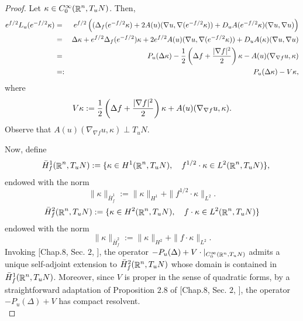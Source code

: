 \documentclass[a4paper,11pt,reqno]{amsart}
\def\R{\mathop{\rm \mathbb{R}}\nolimits}
\begin{document}
\begin{proof}
Let $\kappa\in C_0^{\infty}(\R^n,T_uN)$. Then, 
\begin{eqnarray*}
e^{f/2}L_u(e^{-f/2}\kappa)&=&e^{f/2}\left((\Delta_f(e^{-f/2}\kappa)+2A(u)(\nabla u,\nabla(e^{-f/2}\kappa))+D_uA(e^{-f/2}\kappa)(\nabla u,\nabla u)\right)\\
&=&\Delta\kappa+e^{f/2}\Delta_f(e^{-f/2})\kappa+2e^{f/2}A(u)(\nabla u,\nabla(e^{-f/2}\kappa))+D_uA(\kappa)(\nabla u,\nabla u)\\
&=&P_u(\Delta\kappa)-\frac{1}{2}\left(\Delta f+\frac{\arrowvert\nabla f\arrowvert^2}{2}\right)\kappa-A(u)(\nabla_{\nabla f} u,\kappa)\\
&=:&P_u(\Delta\kappa)-V\kappa,
\end{eqnarray*}
where $$V\kappa:=\frac{1}{2}\left(\Delta f+\frac{\arrowvert\nabla f\arrowvert^2}{2}\right)\kappa+A(u)(\nabla_{\nabla f} u,\kappa).$$
Observe that $A(u)(\nabla_{\nabla f} u,\kappa)\perp T_uN$.

Now, define 
\begin{eqnarray*}
&&\bar{H}_{f}^1(\R^n,T_uN):=\{\kappa\in H^1(\R^n,T_uN),\quad f^{1/2}\cdot \kappa\in L^2(\R^n,T_uN)\},
\end{eqnarray*}
endowed with the norm $$\|\kappa\|_{\bar{H}_{f}^1}:=\|\kappa\|_{H^1}+\|f^{1/2}\cdot\kappa\|_{L^2}.$$
\begin{eqnarray*}
\bar{H}_f^2(\R^n,T_uN):=\{\kappa\in H^2(\R^n,T_uN),\quad
f\cdot\kappa\in L^2(\R^n,T_uN) \}
\end{eqnarray*}
endowed with the norm $$\|\kappa\|_{\bar{H}_f^2}:=\|\kappa\|_{H^2}+\|f\cdot\kappa\|_{L^2}.$$
Invoking [Chap.$8$, Sec. $2$, \cite{Tay-Boo-II}], the operator $-P_u(\Delta)+V\cdot|_{C_0^{\infty}(\R^n,T_uN)}$ admits a unique self-adjoint extension to $\bar{H}_f^2(\R^n,T_uN)$ whose domain is contained in $\bar{H}_f^1(\R^n,T_uN)$. Moreover, since $V$ is proper in the sense of quadratic forms, by a straightforward adaptation of Proposition $2.8$ of [Chap.$8$, Sec. $2$, \cite{Tay-Boo-II}], the operator $-P_u(\Delta)+V$ has compact resolvent. \\


\end{proof}
\end{document}
